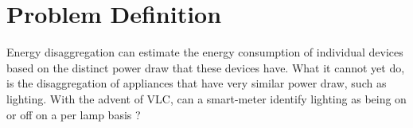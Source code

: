 

\section{Problem Definition}

Energy disaggregation can estimate the energy consumption of individual devices based on the distinct power draw that these devices have.
What it cannot yet do, is the disaggregation of appliances that have very similar power draw, such as lighting.
With the advent of VLC, can a smart-meter identify lighting as being on or off on a per lamp basis ?
